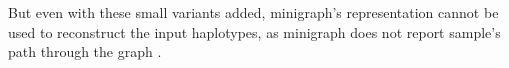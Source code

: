 But even with these small variants added, minigraph's representation cannot be used to reconstruct the input haplotypes, as minigraph does not report sample's path through the graph \cite{minigraphdoc, minigraphissue}. %

